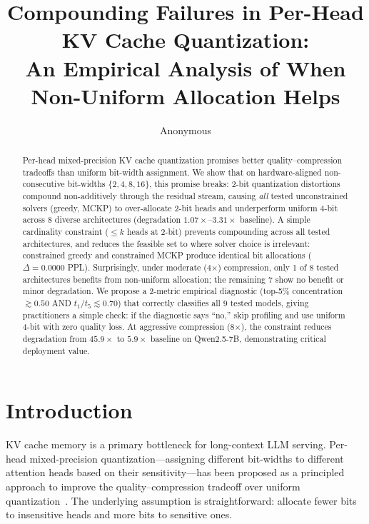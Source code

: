 \documentclass[11pt,a4paper]{article}
\title{Compounding Failures in Per-Head KV Cache Quantization:\\An Empirical Analysis of When Non-Uniform Allocation Helps}
\author{Anonymous}
\date{}
\begin{document}
\maketitle

\begin{abstract}
Per-head mixed-precision KV cache quantization promises better quality--compression tradeoffs than uniform bit-width assignment.
We show that on hardware-aligned non-consecutive bit-widths $\{2,4,8,16\}$, this promise breaks:
2-bit quantization distortions compound non-additively through the residual stream, causing \emph{all} tested unconstrained solvers (greedy, MCKP) to over-allocate 2-bit heads and underperform uniform 4-bit across 8 diverse architectures (degradation $1.07\times$--$3.31\times$ baseline).
A simple cardinality constraint ($\le k$ heads at 2-bit) prevents compounding across all tested architectures, and reduces the feasible set to where solver choice is irrelevant: constrained greedy and constrained MCKP produce identical bit allocations ($\Delta=0.0000$ PPL).
Surprisingly, under moderate (4$\times$) compression, only 1 of 8 tested architectures benefits from non-uniform allocation; the remaining 7 show no benefit or minor degradation.
We propose a 2-metric empirical diagnostic (top-5\% concentration $\gtrsim 0.50$ AND $t_1/t_5 \lesssim 0.70$) that correctly classifies all 9 tested models, giving practitioners a simple check: if the diagnostic says ``no,'' skip profiling and use uniform 4-bit with zero quality loss.
At aggressive compression (8$\times$), the constraint reduces degradation from $45.9\times$ to $5.9\times$ baseline on Qwen2.5-7B, demonstrating critical deployment value.
\end{abstract}

\section{Introduction}
\label{sec:intro}

KV cache memory is a primary bottleneck for long-context LLM serving.
Per-head mixed-precision quantization---assigning different bit-widths to different attention heads based on their sensitivity---has been proposed as a principled approach to improve the quality--compression tradeoff over uniform quantization~\cite{hooper2024kvquant,liu2024kivi,dong2024qaq}.
The underlying assumption is straightforward: allocate fewer bits to insensitive heads and more bits to sensitive ones.
\end{document}

